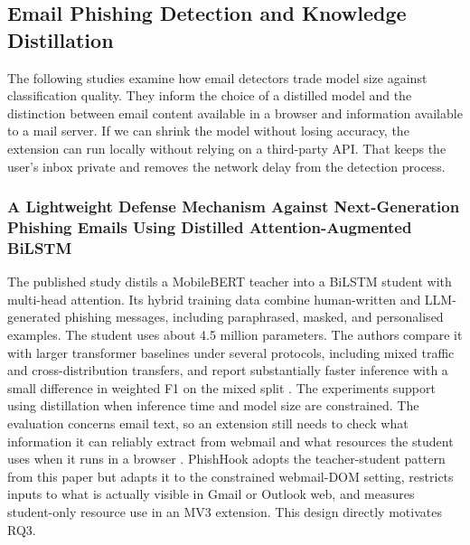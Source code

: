 \documentclass{FastFyp}
\begin{document}
\subsection{Email Phishing Detection and Knowledge Distillation}
The following studies examine how email detectors trade model size against classification quality. They inform the choice of a distilled model and the distinction between email content available in a browser and information available to a mail server. If we can shrink the model without losing accuracy, the extension can run locally without relying on a third-party API. That keeps the user's inbox private and removes the network delay from the detection process.

\subsubsection{A Lightweight Defense Mechanism Against Next-Generation Phishing Emails Using Distilled Attention-Augmented BiLSTM}
The published study distils a MobileBERT teacher into a BiLSTM student with multi-head attention. Its hybrid training data combine human-written and LLM-generated phishing messages, including paraphrased, masked, and personalised examples. The student uses about 4.5 million parameters. The authors compare it with larger transformer baselines under several protocols, including mixed traffic and cross-distribution transfers, and report substantially faster inference with a small difference in weighted F1 on the mixed split \cite{distilbilstm2026}. The experiments support using distillation when inference time and model size are constrained. The evaluation concerns email text, so an extension still needs to check what information it can reliably extract from webmail and what resources the student uses when it runs in a browser \cite{distilbilstm2026}. PhishHook adopts the teacher-student pattern from this paper but adapts it to the constrained webmail-DOM setting, restricts inputs to what is actually visible in Gmail or Outlook web, and measures student-only resource use in an MV3 extension. This design directly motivates RQ3.
\end{document}
